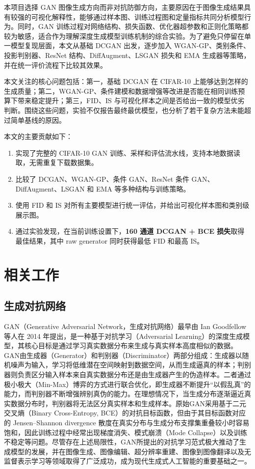 \documentclass[UTF8,a4paper,12pt]{ctexart}
\begin{document}
本项目选择 GAN 图像生成方向而非对抗防御方向，主要原因在于图像生成结果具有较强的可视化解释性，能够通过样本图、训练过程图和定量指标共同分析模型行为。同时，GAN 训练过程对网络结构、损失函数、优化器超参数和正则化策略都较为敏感，适合作为理解深度生成模型训练机制的综合实验。为了避免只停留在单一模型复现层面，本文从基础 DCGAN 出发，逐步加入 WGAN-GP、类别条件、投影判别器、ResNet 结构、DiffAugment、LSGAN 损失和 EMA 生成器等策略，并在统一评价流程下比较其效果。


本文关注的核心问题包括：第一，基础 DCGAN 在 CIFAR-10 上能够达到怎样的生成质量；第二，WGAN-GP、条件建模和数据增强等改进是否能在相同训练预算下带来稳定提升；第三，FID、IS 与可视化样本之间是否给出一致的模型优劣判断。围绕这些问题，实验不仅报告最终最优模型，也分析了若干复杂方法未能超过简单基线的原因。


本文的主要贡献如下：


\begin{enumerate}
\item 实现了完整的 CIFAR-10 GAN 训练、采样和评估流水线，支持本地数据读取，无需重复下载数据集。
\item 比较了 DCGAN、WGAN-GP、条件 GAN、ResNet 条件 GAN、DiffAugment、LSGAN 和 EMA 等多种结构与训练策略。
\item 使用 FID 和 IS 对所有主要模型进行统一评估，并给出可视化样本图和类别级展示图。
\item 通过实验发现，在当前训练设置下，\textbf{160 通道 DCGAN + BCE 损失}取得最佳结果，其中 raw generator 同时获得最低 FID 和最高 IS。
\end{enumerate}


\section{相关工作}

\subsection{生成对抗网络}

GAN（Generative Adversarial Network，生成对抗网络）最早由 Ian Goodfellow 等人在 2014 年提出，是一种基于对抗学习（Adversarial Learning）的深度生成模型，其核心目标是通过学习真实数据分布来生成与真实样本高度相似的数据。GAN由生成器（Generator）和判别器（Discriminator）两部分组成：生成器以随机噪声为输入，学习将低维潜在空间映射到数据空间，从而生成逼真的样本；判别器则负责区分输入样本来自真实数据分布还是由生成器产生的伪造样本。二者通过极小极大（Min-Max）博弈的方式进行联合优化，即生成器不断提升“以假乱真”的能力，而判别器不断增强辨别真伪的能力。在理想情况下，当生成分布逐渐逼近真实数据分布时，判别器将无法区分真实样本和生成样本。原始GAN采用基于二元交叉熵（Binary Cross-Entropy, BCE）的对抗目标函数，但由于其目标函数对应的 Jensen–Shannon divergence 散度在真实分布与生成分布支撑集重叠较小时容易饱和，因此训练过程中经常出现梯度消失、模式崩溃（Mode Collapse）以及训练不稳定等问题。尽管存在上述局限性，GAN所提出的对抗学习范式极大推动了生成模型的发展，并在图像生成、图像编辑、超分辨率重建、图像到图像翻译以及无监督表示学习等领域取得了广泛成功，成为现代生成式人工智能的重要基础之一。
\end{document}

